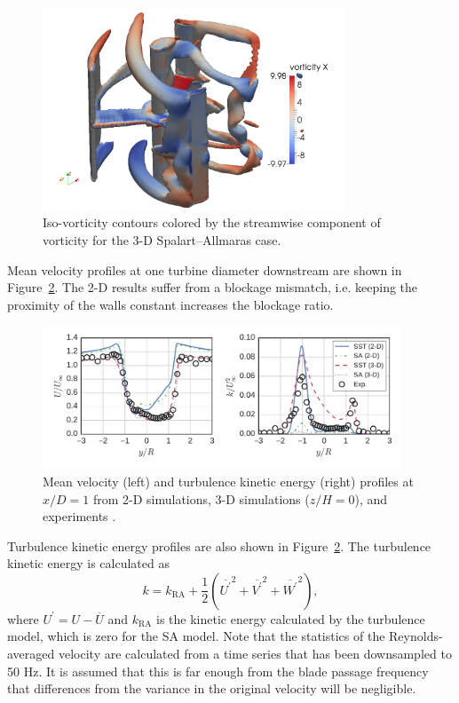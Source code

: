 \documentclass[aip,graphicx]{revtex4-1}
\begin{document}
\begin{figure}
    \includegraphics[width=0.8\textwidth]{figures/3D_vorticity_SA_964_10-threshold}
    
    \caption{Iso-vorticity contours colored by the streamwise component of
        vorticity for the 3-D Spalart--Allmaras case.}
    
    \label{fig:vorticity-3D}
\end{figure}


Mean velocity profiles at one turbine diameter downstream are shown in
Figure~\ref{fig:profiles}. The 2-D results suffer from a blockage
mismatch, i.e. keeping the proximity of the walls constant increases the
blockage ratio.

\begin{figure}
    \centering

    \includegraphics[width=0.95\textwidth]{figures/profiles}

    \caption{Mean velocity (left) and turbulence kinetic energy (right) profiles
        at $x/D=1$ from 2-D simulations, 3-D simulations ($z/H=0$), and experiments
        \cite{Bachant2015-JoT}.}

    \label{fig:profiles}
\end{figure}

Turbulence kinetic energy profiles are also shown in Figure~\ref{fig:profiles}.
The turbulence kinetic energy is calculated as
\begin{equation}
    k = k_{\mathrm{RA}} + \frac{1}{2} \left(
    \overline{U^\prime}^2 +
    \overline{V^\prime}^2 +
    \overline{W^\prime}^2 \right),
    \label{eq:k}
\end{equation}
where $U^\prime = U - \overline{U}$ and $k_{\mathrm{RA}}$ is the kinetic energy
calculated by the turbulence model, which is zero for the SA model. Note that
the statistics of the Reynolds-averaged velocity are calculated from a time
series that has been downsampled to 50 Hz. It is assumed that this is far enough
from the blade passage frequency that differences from the variance in the
original velocity will be negligible.
\end{document}

